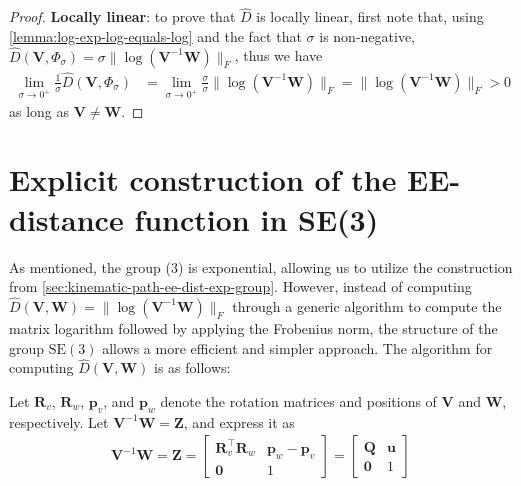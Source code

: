 \begin{proof}
    \textbf{Locally linear}: to prove that $\widehat{D}$ is locally linear, first note that, using \cref{lemma:log-exp-log-equals-log} and the fact that $\sigma$ is non-negative, $\widehat{D}(\mathbf{V}, \Phi_\sigma) = \sigma\|\log{\left(\mathbf{V}^{-1}\mathbf{W}\right)}\|_F$, thus we have
    \begin{align}
            \lim_{\sigma\to0^+}\frac{1}{\sigma}\widehat{D}(\mathbf{V}, \Phi_\sigma) &= \lim_{\sigma\to0^+}\frac{\sigma}{\sigma}\|\log{\left(\mathbf{V}^{-1}\mathbf{W}\right)}\|_F
            = \|\log{\left(\mathbf{V}^{-1}\mathbf{W}\right)}\|_F > 0
    \end{align}
    as long as $\mathbf{V} \not= \mathbf{W}$.
\end{proof}

\section{Explicit construction of the EE-distance function in SE(3)}\label{sec:explicit-construction-SE3}
As mentioned, the group (3) is exponential, allowing us to utilize the construction from \cref{sec:kinematic-path-ee-dist-exp-group}. However, instead of computing $\widehat{D}(\mathbf{V},\mathbf{W}) = \|\log(\mathbf{V}^{-1}\mathbf{W})\|_F$ through a generic algorithm to compute the matrix logarithm followed by applying the Frobenius norm, the structure of the group $\text{SE}(3)$ allows a more efficient and simpler approach. The algorithm for computing $\widehat{D}(\mathbf{V},\mathbf{W})$ is as follows:

Let $\mathbf{R}_v$, $\mathbf{R}_w$, $\mathbf{p}_v$, and $\mathbf{p}_w$ denote the rotation matrices and positions of $\mathbf{V}$ and $\mathbf{W}$, respectively. Let $\mathbf{V}^{-1}\mathbf{W} = \mathbf{Z}$, and express it as 
\begin{align*}
    \mathbf{V}^{-1}\mathbf{W} = \mathbf{Z} =\begin{bmatrix}
        \mathbf{R}_v^\top\mathbf{R}_w & \mathbf{p}_w - \mathbf{p}_v \\
        \mathbf{0} & 1
    \end{bmatrix}
    = \begin{bmatrix}
        \mathbf{Q} & \mathbf{u} \\
        \mathbf{0} & 1
    \end{bmatrix}
\end{align*}

